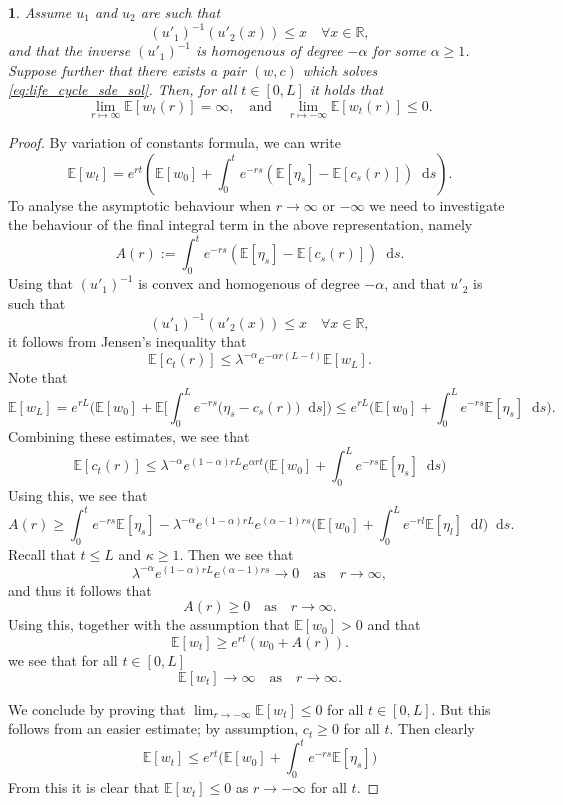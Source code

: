 \documentclass[11pt,oneside,english,reqno,dvipsnames,table]{amsart}
\numberwithin{equation}{section}
\theoremstyle{plain}
\theoremstyle{definition}
\theoremstyle{remark}
\theoremstyle{plain}
\theoremstyle{plain}
\newtheorem{prop}[thm]{\protect\propositionname}
\theoremstyle{plain}
\theoremstyle{plain}
\theoremstyle{plain}
\theoremstyle{plain}
\theoremstyle{plain}
\providecommand{\propositionname}{Proposition}
\newcommand{\EE}{\mathbb{E}}
\newcommand{\RR}{\mathbb{R}}
\newcommand{\dd}{\mathop{}\!\mathrm{d}}
\numberwithin{thm}{section}
\begin{document}
\begin{prop}\label{prop:range_of_expected_w}
Assume $u_1$ and $u_2$ are such that 
    \[ (u'_1)^{-1}(u'_2(x))\leq x \quad \forall x\in \RR,\]
    and that the inverse  $(u'_1)^{-1}$ is homogenous of degree $-\alpha$ for some $\alpha\geq1$.
    Suppose further that there exists a pair $(w,c)$ which solves \eqref{eq:life_cycle_sde_sol}. 
    Then, for all $t\in [0,L]$ it holds that%
    \begin{equation*}
            \lim_{r\mapsto \infty} \EE[w_t(r)] =\infty, \quad \mathrm{and} \quad \lim _{r\mapsto -\infty} \EE[w_t(r)]\leq 0 . 
    \end{equation*}
\end{prop}
\begin{proof}
By variation of constants formula, we can write 
%
\[
\EE[w_t] = e^{rt}\left(\EE[w_0]+\int_0^t e^{-rs} (\EE[\eta_s]-\EE[c_s(r)])\dd s\right). 
\] 
%
To analyse the asymptotic behaviour when $r\rightarrow \infty $ or $-\infty$ we need to investigate the behaviour of the final integral term in the above representation, namely
%
\[
A(r):=\int_0^t e^{-rs}\left(\EE[\eta_s]-\EE[c_s(r)]\right)\dd s. 
\]
%
Using that $(u'_1)^{-1}$ is convex and homogenous of degree $-\alpha$, and that $u'_2$ is such that 
%
\[
(u'_1)^{-1}(u'_2(x))\leq x \quad \forall x\in \RR, 
\]
%
it follows from Jensen's inequality that 
%
\[
\EE[c_t(r)] \leq \lambda^{-\alpha} e^{-\alpha r(L-t)} \EE[w_L].
\]
%
Note that 
%
\[\EE[w_L]= e^{rL}\bigg(\EE[w_0]+\EE\Big[\int_0^L e^{-rs}\big(\eta_s-c_s(r)\big)\dd s\Big] \bigg)\leq e^{rL}\bigg(\EE[w_0]+\int_0^L e^{-rs}\EE[\eta_s]\dd s\bigg) .
\]
%
Combining these estimates, we see that
%
\[
\EE[c_t(r)] \leq \lambda^{-\alpha} e^{(1-\alpha) rL} e^{\alpha r t}\bigg(\EE[w_0]+\int_0^L e^{-rs}\EE[\eta_s]\dd s\bigg) 
\]
%
Using this, we see that 
%
\[
A(r)\geq \int_0^t e^{-rs}\EE[\eta_s]-\lambda^{-\alpha} e^{(1-\alpha) rL} e^{(\alpha-1)rs} \bigg(\EE[w_0]+\int_0^L e^{-rl}\EE[\eta_l]\dd l\bigg)\dd s. 
\]
%
 Recall that $t\leq L$ and $\kappa\geq 1$. Then we see that 
\[
\lambda^{-\alpha} e^{(1-\alpha) rL} e^{(\alpha-1)rs}\rightarrow 0 \quad {\mathrm{as}} \quad r\rightarrow \infty,  
\]
and thus it follows that 
\[
A(r)\geq 0 \quad \mathrm{as}\quad r\rightarrow \infty.
\]
Using this, together with the assumption that $\EE[w_0]>0$ and that 
\[
\EE[w_t] \geq e^{rt}(w_0 + A(r)).
\]
we see that for all $t\in [0,L]$
\[
\EE[w_t]\rightarrow \infty \quad \mathrm{as} \quad r\rightarrow \infty. 
\]

We conclude by proving that $\lim_{r\to -\infty}\EE[w_t]\leq0$ for all $t\in [0,L]$. But this follows from an easier estimate; by assumption, $c_t\geq 0$ for all $t$. Then  clearly 
\[
\EE[w_t]\leq e^{rt}\bigg(\EE[w_0]+\int_0^t e^{-rs}\EE[\eta_s]\bigg)
\]
From this it is clear that $\EE[w_t]\leq  0$ as $r\rightarrow -\infty$ for all $t$.
\end{proof}
\end{document}
